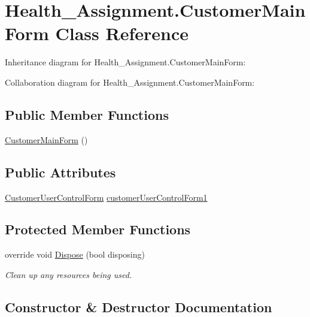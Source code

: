 \hypertarget{class_health___assignment_1_1_customer_main_form}{}\section{Health\+\_\+\+Assignment.\+Customer\+Main\+Form Class Reference}
\label{class_health___assignment_1_1_customer_main_form}


Inheritance diagram for Health\+\_\+\+Assignment.\+Customer\+Main\+Form\+:


Collaboration diagram for Health\+\_\+\+Assignment.\+Customer\+Main\+Form\+:
\subsection*{Public Member Functions}
\begin{DoxyCompactItemize}
\item 
\hyperlink{class_health___assignment_1_1_customer_main_form_a3f77665b9d1ae4bb70f83648a4e58386}{Customer\+Main\+Form} ()
\end{DoxyCompactItemize}
\subsection*{Public Attributes}
\begin{DoxyCompactItemize}
\item 
\hyperlink{class_health___assignment_1_1_customer_user_control_form}{Customer\+User\+Control\+Form} \hyperlink{class_health___assignment_1_1_customer_main_form_ae9b87b12c6851ea780f09e29d0634e8f}{customer\+User\+Control\+Form1}
\end{DoxyCompactItemize}
\subsection*{Protected Member Functions}
\begin{DoxyCompactItemize}
\item 
override void \hyperlink{class_health___assignment_1_1_customer_main_form_a2affce3deb6a67cf7ea718bcffc572db}{Dispose} (bool disposing)
\begin{DoxyCompactList}\small\item\em Clean up any resources being used. \end{DoxyCompactList}\end{DoxyCompactItemize}


\subsection{Constructor \& Destructor Documentation}
\mbox{\label{class_health___assignment_1_1_customer_main_form_a3f77665b9d1ae4bb70f83648a4e58386}} 
